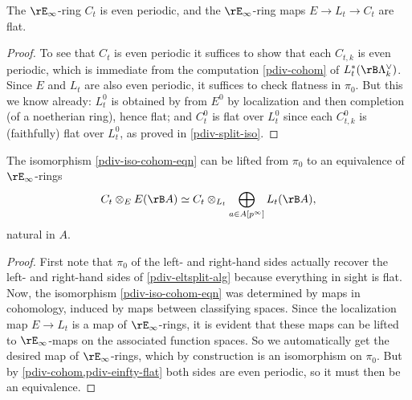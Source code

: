 \begin{lemma}
  \label{pdiv-einfty-flat}
  The $\rE_\infty$-ring $C_t$ is even periodic, and the
  $\rE_\infty$-ring maps $E \to L_t \to C_t$ are flat.
\end{lemma}

\begin{proof}
  To see that $C_t$ is even periodic it suffices to show that each
  $C_{t,k}$ is even periodic, which is immediate from the computation
  \cref{pdiv-cohom} of $L_t^*(\rB\Lambda^\dual_k)$. Since $E$ and
  $L_t$ are also even periodic, it suffices to check flatness in
  $\pi_0$. But this we know already: $L_t^0$ is obtained by from $E^0$
  by localization and then completion (of a noetherian ring), hence
  flat; and $C_t^0$ is flat over $L_t^0$ since each $C_{t,k}^0$ is
  (faithfully) flat over $L_t^0$, as proved in \cref{pdiv-split-iso}.
\end{proof}

\begin{proposition}
  \label{pdiv-main}
  The isomorphism \cref{pdiv-iso-cohom-eqn} can be lifted from $\pi_0$
  to an equivalence of $\rE_\infty$-rings
  \[
  C_t \otimes_E E(\rB A) \iso C_t \otimes_{L_t} \bigoplus_{a \in
    A[p^\infty]} L_t(\rB A),
  \]
  natural in $A$.
\end{proposition}

\begin{proof}
  First note that $\pi_0$ of the left- and right-hand sides actually
  recover the left- and right-hand sides of \cref{pdiv-eltsplit-alg}
  because everything in sight is flat. Now, the isomorphism
  \cref{pdiv-iso-cohom-eqn} was determined by maps in cohomology,
  induced by maps between classifying spaces. Since the localization
  map $E \to L_t$ is a map of $\rE_\infty$-rings, it is evident that
  these maps can be lifted to $\rE_\infty$-maps on the associated
  function spaces. So we automatically get the desired map of
  $\rE_\infty$-rings, which by construction is an isomorphism on
  $\pi_0$. But by \cref{pdiv-cohom,pdiv-einfty-flat} both sides are
  even periodic, so it must then be an equivalence.
\end{proof}
